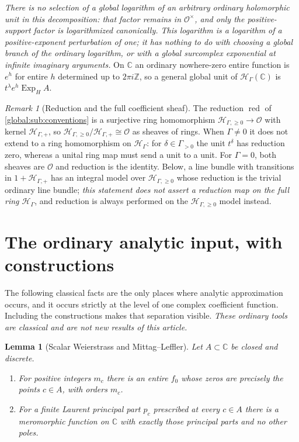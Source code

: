 \documentclass[11pt,letterpaper]{article}
\newtheorem{lemma}[lemma]{Lemma}
\theoremstyle{definition}
\theoremstyle{remark}
\newtheorem{remark}[remark]{Remark}
\newcommand{\C}{\mathbb C}
\newcommand{\Z}{\mathbb Z}
\newcommand{\OO}{\mathcal O}
\newcommand{\HH}{\mathscr H_\Gamma}
\newcommand{\HP}{\mathscr H_{\Gamma,+}}
\newcommand{\HI}{\mathscr H_{\Gamma,\ge0}}
\newcommand{\red}{\operatorname{red}}
\newcommand{\ExpH}{\operatorname{Exp}_{H}}
\numberwithin{equation}{section}
\begin{document}
\emph{There is no selection of a global logarithm of an arbitrary ordinary holomorphic unit in this decomposition: that factor remains in $\OO^\times$, and only the positive-support factor is logarithmized canonically. This logarithm is a logarithm of a positive-exponent perturbation of one; it has nothing to do with choosing a global branch of the ordinary logarithm, or with a global surcomplex exponential at infinite imaginary arguments.} On $\C$ an ordinary nowhere-zero entire function is $e^h$ for entire $h$ determined up to $2\pi i\Z$, so a general global unit of $\HH(\C)$ is $t^\lambda e^h\ExpH A$.

\begin{remark}[Reduction and the full coefficient sheaf]\label{global:rem:reduction}
The reduction $\red$ of \cref{global:sub:conventions} is a surjective ring homomorphism $\HI\to\OO$ with kernel $\HP$, so $\HI/\HP\cong\OO$ as sheaves of rings. When $\Gamma\ne0$ it does not extend to a ring homomorphism on $\HH$: for $\delta\in\Gamma_{>0}$ the unit $t^\delta$ has reduction zero, whereas a unital ring map must send a unit to a unit. For $\Gamma=0$, both sheaves are $\OO$ and reduction is the identity. Below, a line bundle with transitions in $1+\HP$ has an integral model over $\HI$ whose reduction is the trivial ordinary line bundle; \emph{this statement does not assert a reduction map on the full ring $\HH$}, and reduction is always performed on the $\HI$ model instead.
\end{remark}

\section{The ordinary analytic input, with constructions}\label{global:sec:scalar}

The following classical facts are the only places where analytic approximation occurs, and it occurs strictly at the level of one complex coefficient function. Including the constructions makes that separation visible. \emph{These ordinary tools are classical and are not new results of this article.}

\begin{lemma}[Scalar Weierstrass and Mittag--Leffler]\label{global:lem:scalarML}
Let $A\subset\C$ be closed and discrete.
\begin{enumerate}
\item For positive integers $m_c$ there is an entire $f_0$ whose zeros are precisely the points $c\in A$, with orders $m_c$.
\item For a finite Laurent principal part $p_c$ prescribed at every $c\in A$ there is a meromorphic function on $\C$ with exactly those principal parts and no other poles.
\end{enumerate}
\end{lemma}
\end{document}
